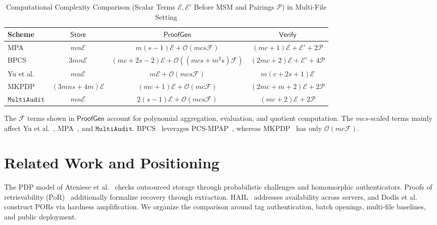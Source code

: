 \documentclass[lettersize,journal]{IEEEtran}
\newcommand{\CompExp}{\mathcal{E}}
\newcommand{\CompPair}{\mathcal{P}}
\newcommand{\CompField}{\mathcal{F}}
\newcommand{\Store}{\ensuremath{\mathsf{Store}}}
\newcommand{\ProofGen}{\ensuremath{\mathsf{ProofGen}}}
\newcommand{\Verify}{\ensuremath{\mathsf{Verify}}}
\newcommand{\MultiAudit}{\ensuremath{\mathtt{MultiAudit}}}
\begin{document}
\begin{table}[!t]
\centering
\caption{Computational Complexity Comparison (Scalar Terms $\CompExp,\CompExp'$ Before MSM and Pairings $\CompPair$) in Multi-File Setting}
\label{tab:computation}
\renewcommand{\arraystretch}{1.3}
\begin{tabular}{l|c|c|c}
\hline
\textbf{Scheme} & \textbf{$\Store$} & \textbf{$\ProofGen$} & \textbf{$\Verify$} \\
\hline
MPA~\cite{XuTIFS26} & $mn\CompExp$ & $m(s-1)\CompExp+\mathcal{O}(mcs\CompField)$ & $(mc+1)\CompExp+\CompExp'+2\CompPair$ \\
BPCS~\cite{ZhangTPDS23} & $3mn\CompExp$& $(mc+2s-2)\CompExp+\mathcal{O}((mcs+m^2s)\CompField)$& $(2mc+2)\CompExp+\CompExp'+4\CompPair$\\
Yu et al.~\cite{YuTC25} & $mn\CompExp$ & $m\CompExp+\mathcal{O}(mcs\CompField)$ & $m(c+2s+1)\CompExp$\\
MKPDP~\cite{MiaoSCIS2026} &  $(3mns+4m)\CompExp$ & $(mc+1)\CompExp+\mathcal{O}(mc\CompField)$ & $(2mc+m+2)\CompExp+2\CompPair$\\
\hline
\textbf{\MultiAudit{}} & $mn\CompExp$ & $2(s-1)\CompExp+\mathcal{O}(mcs\CompField)$ & $(mc+2)\CompExp+2\CompPair$ \\
\hline
\end{tabular}
\footnotesize
\begin{minipage}{0.96\textwidth}
The \(\CompField\) terms shown in \ProofGen{} account for polynomial aggregation, evaluation, and quotient computation. The \(mcs\)-scaled terms mainly affect Yu et al.~\cite{YuTC25}, MPA~\cite{XuTIFS26}, and \MultiAudit{}. BPCS~\cite{ZhangTPDS23} leverages PCS-MPAP~\cite{Boneh2020PCS}, whereas MKPDP~\cite{MiaoSCIS2026} has only \(\mathcal{O}(mc\CompField)\).
\end{minipage}
\end{table}



\section{Related Work and Positioning}
\label{sec:related_works}
The PDP model of Ateniese et al.~\cite{Ateniese2007PDP} checks outsourced storage through probabilistic challenges and homomorphic authenticators. Proofs of retrievability (PoR)~\cite{Juels2007POR,Shacham2008POR} additionally formalize recovery through extraction. HAIL~\cite{Bowers2009HAIL} addresses availability across servers, and Dodis et al.~\cite{Dodis2009POR} construct PORs via hardness amplification. We organize the comparison around tag authentication, batch openings, multi-file baselines, and public deployment.
\end{document}
